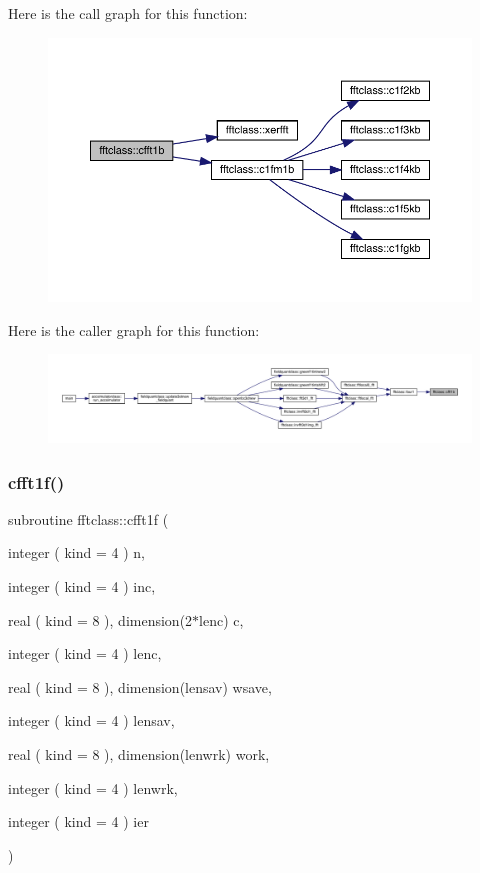 Here is the call graph for this function\+:\nopagebreak
\begin{figure}[H]
\begin{center}
\leavevmode
\includegraphics[width=350pt]{namespacefftclass_acc0dd0d3644e3ff67fd2dfb23dcb4e40_cgraph}
\end{center}
\end{figure}
Here is the caller graph for this function\+:\nopagebreak
\begin{figure}[H]
\begin{center}
\leavevmode
\includegraphics[width=350pt]{namespacefftclass_acc0dd0d3644e3ff67fd2dfb23dcb4e40_icgraph}
\end{center}
\end{figure}
\mbox{\label{namespacefftclass_a4cc16a9191f915424a42d281f821c291}} 
\subsubsection{\texorpdfstring{cfft1f()}{cfft1f()}}
{\footnotesize\ttfamily subroutine fftclass\+::cfft1f (\begin{DoxyParamCaption}\item[{integer ( kind = 4 )}]{n,  }\item[{integer ( kind = 4 )}]{inc,  }\item[{real ( kind = 8 ), dimension(2$\ast$lenc)}]{c,  }\item[{integer ( kind = 4 )}]{lenc,  }\item[{real ( kind = 8 ), dimension(lensav)}]{wsave,  }\item[{integer ( kind = 4 )}]{lensav,  }\item[{real ( kind = 8 ), dimension(lenwrk)}]{work,  }\item[{integer ( kind = 4 )}]{lenwrk,  }\item[{integer ( kind = 4 )}]{ier }\end{DoxyParamCaption})}

